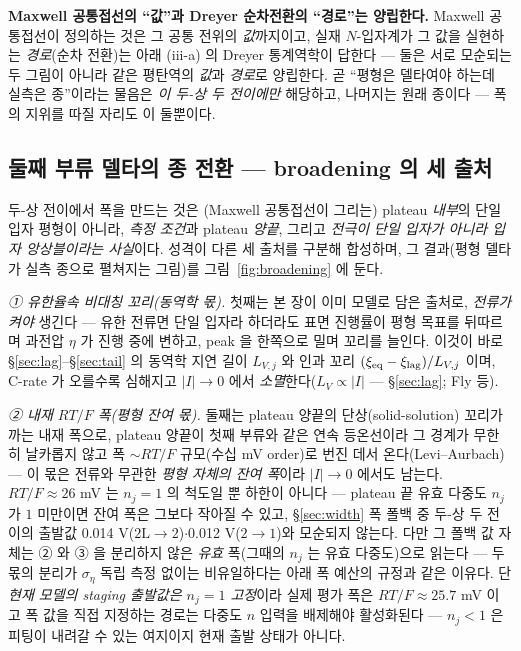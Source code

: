 \textbf{Maxwell 공통접선의 ``값''과 Dreyer 순차전환의 ``경로''는 양립한다.} Maxwell 공통접선이 정의하는 것은
그 공통 전위의 \emph{값}까지이고, 실재 $N$-입자계가 그 값을 실현하는 \emph{경로}(순차 전환)는 아래 (iii-a) 의
Dreyer 통계역학이 답한다 --- 둘은 서로 모순되는 두 그림이 아니라 같은 평탄역의 \emph{값}과 \emph{경로}로
양립한다. 곧 ``평형은 델타여야 하는데 실측은 종''이라는 물음은 \emph{이 두-상 두 전이에만} 해당하고,
나머지는 원래 종이다 --- 폭의 지위를 따질 자리도 이 둘뿐이다.

\subsection{둘째 부류 델타의 종 전환 --- broadening 의 세 출처}\label{sec:broadening-sources}
두-상 전이에서 폭을 만드는 것은 (Maxwell
공통접선이 그리는) plateau \emph{내부}의 단일 입자 평형이 아니라, \emph{측정 조건}과 plateau \emph{양끝}, 그리고
\emph{전극이 단일 입자가 아니라 입자 앙상블이라는 사실}이다. 성격이 다른 세 출처를 구분해 합성하며, 그 결과(평형 델타가
실측 종으로 펼쳐지는 그림)를 그림~\ref{fig:broadening} 에 둔다.

\emph{① 유한율속 비대칭 꼬리(동역학 몫).} 첫째는 본 장이 이미 모델로 담은 출처로, \emph{전류가 켜야} 생긴다 --- 유한
전류면 단일 입자라 하더라도 표면 진행률이 평형 목표를 뒤따르며 과전압 $\eta$ 가 진행 중에 변하고, peak 을 한쪽으로
밀며 꼬리를 늘인다. 이것이 바로 \S\ref{sec:lag}--\S\ref{sec:tail} 의 동역학 지연 길이 $L_{V,j}$ 와 인과 꼬리
$(\xi_{\mathrm{eq}}-\xi_\mathrm{lag})/L_{V,j}$ 이며, C-rate 가 오를수록 심해지고 $|I|\!\to\!0$ 에서
\emph{소멸}한다($L_V\propto|I|$ --- \S\ref{sec:lag}; Fly 등\cite{fly2020}).

\emph{② 내재 $RT/F$ 폭(평형 잔여 몫).} 둘째는 plateau 양끝의 단상(solid-solution) 꼬리가 까는 내재 폭으로, plateau
양끝이 첫째 부류와 같은 연속 등온선이라 그 경계가 무한히 날카롭지 않고 폭 $\sim RT/F$ 규모(수십 mV order)로 번진 데서
온다(Levi--Aurbach\cite{leviaurbach1999}) --- 이 몫은 전류와 무관한 \emph{평형 자체의 잔여 폭}이라 $|I|\!\to\!0$ 에서도
남는다. $RT/F\!\approx\!26$ mV 는 $n_j{=}1$ 의 척도일 뿐 하한이 아니다 --- plateau 끝 유효 다중도 $n_j$ 가
$1$ 미만이면 잔여 폭은 그보다 작아질 수 있고, \S\ref{sec:width} 폭 폴백 중 두-상 두 전이의 출발값
0.014 V($2\mathrm L\!\to\!2$)$\cdot$0.012 V($2\!\to\!1$)와 모순되지 않는다. 다만 그 폴백 값 자체는 ② 와
③ 을 분리하지 않은 \emph{유효} 폭(그때의 $n_j$ 는 유효 다중도)으로 읽는다 --- 두 몫의 분리가
$\sigma_\eta$ 독립 측정 없이는 비유일하다는 아래 폭 예산의 규정과 같은 이유다. 단 \emph{현재 모델의 staging
출발값은 $n_j{=}1$ 고정}이라 실제 평가 폭은 $RT/F\!\approx\!25.7$ mV 이고 폭 값을 직접 지정하는 경로는 다중도
$n$ 입력을 배제해야 활성화된다 --- $n_j\!<\!1$ 은 피팅이 내려갈 수 있는 여지이지 현재 출발 상태가 아니다.


